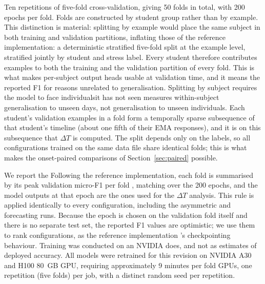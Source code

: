 \documentclass[preprint,12pt,authoryear]{elsarticle}
\newcommand{\dt}{$\Delta T$}
\providecommand{\DIFaddtex}[1]{{\protect\color{blue} \sf #1}} %
\providecommand{\DIFdeltex}[1]{{\protect\color{red} \scriptsize #1}} %
\providecommand{\DIFaddbegin}{} %
\providecommand{\DIFaddend}{} %
\providecommand{\DIFdelbegin}{} %
\providecommand{\DIFdelend}{} %
\providecommand{\DIFadd}[1]{\texorpdfstring{\DIFaddtex{#1}}{#1}} %
\providecommand{\DIFdel}[1]{\texorpdfstring{\DIFdeltex{#1}}{}} %
\newcommand{\DIFscaledelfig}{0.5}
\newlength{\DIFdelgraphicswidth} %
\newlength{\DIFdelgraphicsheight} %
\newcommand{\DIFaddincludegraphics}[2][]{{\color{blue}\fbox{\DIFOincludegraphics[#1]{#2}}}} %
\newcommand{\DIFdelincludegraphics}[2][]{%
\sbox{\DIFdelgraphicsbox}{\DIFOincludegraphics[#1]{#2}}%
\settoboxwidth{\DIFdelgraphicswidth}{\DIFdelgraphicsbox} %
\settoboxtotalheight{\DIFdelgraphicsheight}{\DIFdelgraphicsbox} %
\scalebox{\DIFscaledelfig}{%
\parbox[b]{\DIFdelgraphicswidth}{\usebox{\DIFdelgraphicsbox}\\[-\baselineskip] \rule{\DIFdelgraphicswidth}{0em}}\llap{\resizebox{\DIFdelgraphicswidth}{\DIFdelgraphicsheight}{%
\setlength{\unitlength}{\DIFdelgraphicswidth}%
\begin{picture}(1,1)%
\thicklines\linethickness{2pt} %
{\color[rgb]{1,0,0}\put(0,0){\framebox(1,1){}}}%
{\color[rgb]{1,0,0}\put(0,0){\line( 1,1){1}}}%
{\color[rgb]{1,0,0}\put(0,1){\line(1,-1){1}}}%
\end{picture}%
}\hspace*{3pt}}} %
} %
\DeclareRobustCommand{\DIFaddbegin}{\DIFOaddbegin \let\includegraphics\DIFaddincludegraphics} %
\DeclareRobustCommand{\DIFaddend}{\DIFOaddend \let\includegraphics\DIFOincludegraphics} %
\DeclareRobustCommand{\DIFdelbegin}{\DIFOdelbegin \let\includegraphics\DIFdelincludegraphics} %
\DeclareRobustCommand{\DIFdelend}{\DIFOaddend \let\includegraphics\DIFOincludegraphics} %
\begin{document}
Ten repetitions of five-fold cross-validation, giving 50 folds in total,
with 200 epochs per fold. Folds are \DIFdelbegin \DIFdel{constructed by student group rather
than by example. This distinction is material: splitting by example
would place the same subject in both training and validation partitions, inflating }\DIFdelend \DIFaddbegin \DIFadd{those of the reference
implementation: a deterministic stratified five-fold split at the
example level, stratified jointly by student and stress label. Every
student therefore contributes examples to both the training and the
validation partition of every fold. This is what makes per-subject
output heads usable at validation time, and it means the reported }\DIFaddend F1
\DIFdelbegin \DIFdel{for reasons unrelated to generalisation. Splitting by
subject requires the model to face individualsit has not seen}\DIFdelend \DIFaddbegin \DIFadd{measures within-subject generalisation to unseen days, not
generalisation to unseen individuals. Each student's validation
examples in a fold form a temporally sparse subsequence of that
student's timeline (about one fifth of their EMA responses), and it is
on this subsequence that \dt{} is computed. The split depends only on
the labels, so all configurations trained on the same data file share
identical folds; this is what makes the onset-paired comparisons of
Section~\ref{sec:paired} possible}\DIFaddend .

\DIFdelbegin \DIFdel{We report the }\DIFdelend \DIFaddbegin \DIFadd{Following the reference implementation, each fold is summarised by its
}\DIFaddend peak validation micro-F1 \DIFdelbegin \DIFdel{per fold , matching }\DIFdelend \DIFaddbegin \DIFadd{over the 200 epochs, and the model outputs at
that epoch are the ones used for the \dt{} analysis. This rule is
applied identically to every configuration, including the asymmetric
and forecasting runs. Because the epoch is chosen on the validation
fold itself and there is no separate test set, the reported F1 values
are optimistic; we use them to rank configurations, as }\DIFaddend the reference
implementation \DIFdelbegin \DIFdel{'s checkpointing behaviour. Training was conducted on an
NVIDIA }\DIFdelend \DIFaddbegin \DIFadd{does, and not as estimates of deployed accuracy. All models were retrained for this revision on NVIDIA A30 and }\DIFaddend H100
\DIFdelbegin \DIFdel{80~GB GPU, requiring approximately 9 minutes per fold}\DIFdelend \DIFaddbegin \DIFadd{GPUs, one repetition (five folds) per job, with a distinct random seed
per repetition}\DIFaddend .
\end{document}
